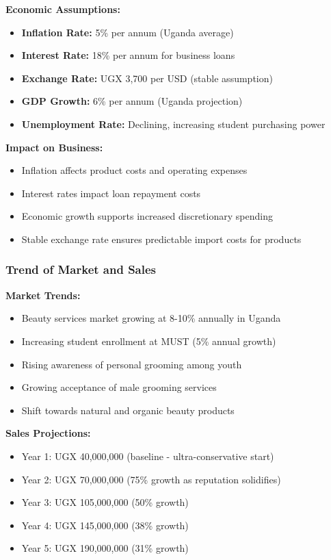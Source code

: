 \documentclass[a4paper,12pt]{article}
\begin{document}
\textbf{Economic Assumptions:}
\begin{itemize}[leftmargin=2em]
    \item \textbf{Inflation Rate:} 5\% per annum (Uganda average)
    \item \textbf{Interest Rate:} 18\% per annum for business loans
    \item \textbf{Exchange Rate:} UGX 3,700 per USD (stable assumption)
    \item \textbf{GDP Growth:} 6\% per annum (Uganda projection)
    \item \textbf{Unemployment Rate:} Declining, increasing student purchasing power
\end{itemize}

\textbf{Impact on Business:}
\begin{itemize}[leftmargin=2em]
    \item Inflation affects product costs and operating expenses
    \item Interest rates impact loan repayment costs
    \item Economic growth supports increased discretionary spending
    \item Stable exchange rate ensures predictable import costs for products
\end{itemize}

\subsubsection{Trend of Market and Sales}

\textbf{Market Trends:}
\begin{itemize}[leftmargin=2em]
    \item Beauty services market growing at 8-10\% annually in Uganda
    \item Increasing student enrollment at MUST (5\% annual growth)
    \item Rising awareness of personal grooming among youth
    \item Growing acceptance of male grooming services
    \item Shift towards natural and organic beauty products
\end{itemize}

\textbf{Sales Projections:}
\begin{itemize}[leftmargin=2em]
    \item Year 1: UGX 40,000,000 (baseline - ultra-conservative start)
    \item Year 2: UGX 70,000,000 (75\% growth as reputation solidifies)
    \item Year 3: UGX 105,000,000 (50\% growth)
    \item Year 4: UGX 145,000,000 (38\% growth)
    \item Year 5: UGX 190,000,000 (31\% growth)
\end{itemize}
\end{document}
